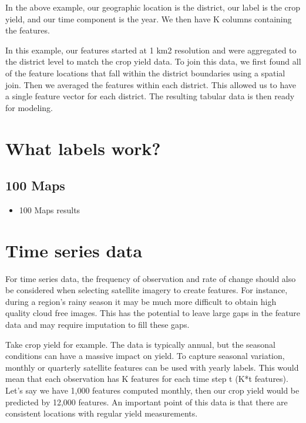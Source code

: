 \documentclass[
  letterpaper,
  DIV=11,
  numbers=noendperiod]{scrreprt}
\providecommand{\tightlist}{%
  \setlength{\itemsep}{0pt}\setlength{\parskip}{0pt}}\usepackage{longtable,booktabs,array}
\begin{document}
In the above example, our geographic location is the district, our label
is the crop yield, and our time component is the year. We then have K
columns containing the features.

In this example, our features started at 1 km2 resolution and were
aggregated to the district level to match the crop yield data. To join
this data, we first found all of the feature locations that fall within
the district boundaries using a spatial join. Then we averaged the
features within each district. This allowed us to have a single feature
vector for each district. The resulting tabular data is then ready for
modeling.

\hypertarget{what-labels-work}{%
\chapter{What labels work?}\label{what-labels-work}}

\hypertarget{maps}{%
\section{100 Maps}\label{maps}}

\begin{itemize}
\tightlist
\item
  100 Maps results
\end{itemize}

\hypertarget{time-series-data}{%
\chapter{Time series data}\label{time-series-data}}

For time series data, the frequency of observation and rate of change
should also be considered when selecting satellite imagery to create
features. For instance, during a region's rainy season it may be much
more difficult to obtain high quality cloud free images. This has the
potential to leave large gaps in the feature data and may require
imputation to fill these gaps.

Take crop yield for example. The data is typically annual, but the
seasonal conditions can have a massive impact on yield. To capture
seasonal variation, monthly or quarterly satellite features can be used
with yearly labels. This would mean that each observation has K features
for each time step t (K*t features). Let's say we have 1,000 features
computed monthly, then our crop yield would be predicted by 12,000
features. An important point of this data is that there are consistent
locations with regular yield measurements.
\end{document}
